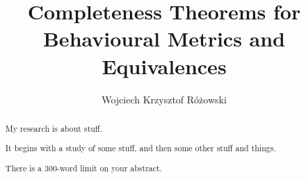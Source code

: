 
\title{Completeness Theorems for Behavioural Metrics and Equivalences}
\author{Wojciech Krzysztof R\'{o}\.{z}owski}

\maketitle
\makedeclaration

\begin{abstract} %
My research is about stuff.

It begins with a study of some stuff, and then some other stuff and things.

There is a 300-word limit on your abstract.
\end{abstract}

